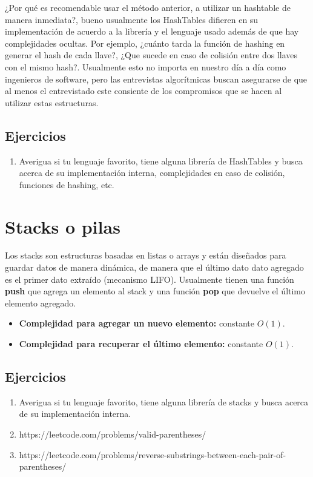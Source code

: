 ¿Por qué es recomendable usar el método anterior, a utilizar un hashtable de manera inmediata?, bueno usualmente los HashTables difieren en su implementación de acuerdo a la librería y el lenguaje usado además de que hay complejidades ocultas. Por ejemplo, ¿cuánto tarda la función de hashing en generar el hash de cada llave?, ¿Que sucede en caso de colisión entre dos llaves con el mismo hash?. Usualmente esto no importa en nuestro día a día como ingenieros de software, pero las entrevistas algorítmicas buscan asegurarse de que al menos el entrevistado este consiente de los compromisos que se hacen al utilizar estas estructuras.

\subsection{Ejercicios}
\begin{enumerate}
    \item Averigua si tu lenguaje favorito, tiene alguna librería de HashTables y busca acerca de su implementación interna, complejidades en caso de colisión, funciones de hashing, etc.
\end{enumerate}

\section{Stacks o pilas}

Los stacks son estructuras basadas en listas o arrays y están diseñados para guardar datos de manera dinámica, de manera que el último dato dato agregado es el primer dato extraído (mecanismo LIFO). Usualmente tienen una función \textbf{push} que agrega un elemento al stack y una función \textbf{pop} que devuelve el último elemento agregado.

\begin{itemize}
    \item \textbf{Complejidad para agregar un nuevo elemento:} constante $O(1)$.
    \item \textbf{Complejidad para recuperar el último elemento:} constante $O(1)$.
\end{itemize}

\subsection{Ejercicios}

\begin{enumerate}
    \item Averigua si tu lenguaje favorito, tiene alguna librería de stacks y busca acerca de su implementación interna.
    \item https://leetcode.com/problems/valid-parentheses/
    \item https://leetcode.com/problems/reverse-substrings-between-each-pair-of-parentheses/
\end{enumerate}


